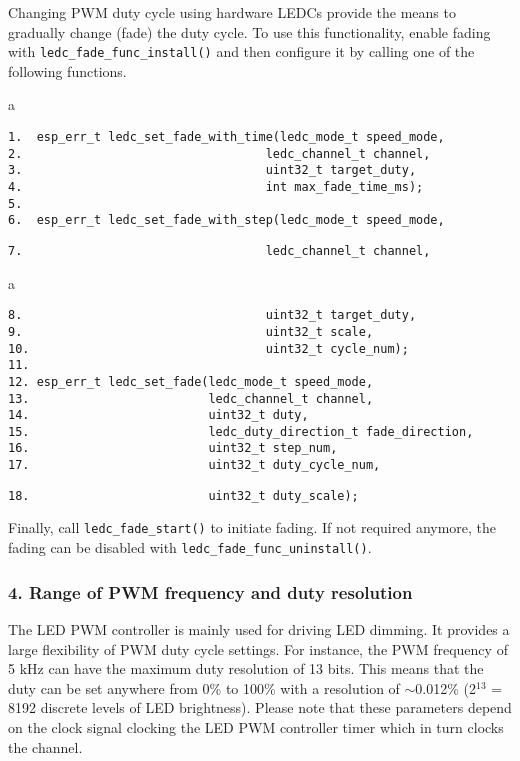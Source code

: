 \documentclass[a4paper,12pt]{book}
\begin{document}
\begin{term}{Changing PWM duty cycle using hardware}
    LEDCs provide the means to gradually change (fade) the duty cycle. To use this functionality, enable fading with \verb|ledc_fade_func_install()| and then configure it by calling one of the following functions.

\parskip 6pt
\begin{codebloc}
\begin{tabular}{a}
\vspace{2pt}
\begin{verbatim}
1.  esp_err_t ledc_set_fade_with_time(ledc_mode_t speed_mode,
2.                                  ledc_channel_t channel,
3.                                  uint32_t target_duty,
4.                                  int max_fade_time_ms);
5.	
6.  esp_err_t ledc_set_fade_with_step(ledc_mode_t speed_mode,
\end{verbatim}
\verb|7.                                  ledc_channel_t channel,|
\end{tabular}
\end{codebloc}

\begin{codebloc}
\begin{tabular}{a}
\vspace{2pt}
\begin{verbatim}
8.                                  uint32_t target_duty,
9.                                  uint32_t scale,
10.                                 uint32_t cycle_num);
11.	
12. esp_err_t ledc_set_fade(ledc_mode_t speed_mode,
13.                         ledc_channel_t channel,
14.                         uint32_t duty,
15.                         ledc_duty_direction_t fade_direction,
16.                         uint32_t step_num,
17.                         uint32_t duty_cycle_num,
\end{verbatim}
\verb|18.                         uint32_t duty_scale);|
\end{tabular}
\end{codebloc}

    Finally, call \verb|ledc_fade_start()| to initiate fading. If not required anymore, the fading can be disabled with \verb|ledc_fade_func_uninstall()|.
\end{term}

\subsubsection{4. Range of PWM frequency and duty resolution}
The LED PWM controller is mainly used for driving LED dimming. It provides a large flexibility of PWM duty cycle settings. For instance, the PWM frequency of 5 kHz can have the maximum duty resolution of 13 bits. This means that the duty can be set anywhere from 0\% to 100\% with a resolution of $\sim$0.012\% (2$^{13}$ = 8192 discrete levels of LED brightness). Please note that these parameters depend on the clock signal clocking the LED PWM controller timer which in turn clocks the channel.
\end{document}
